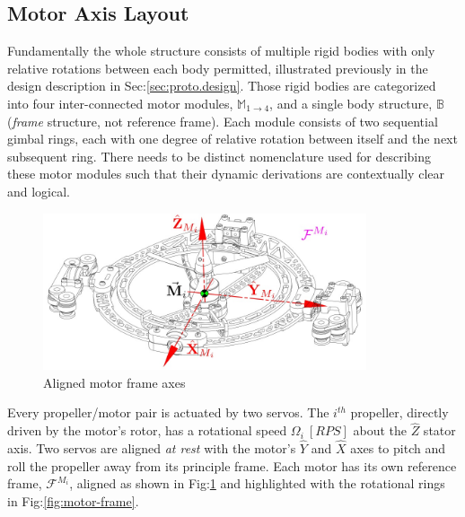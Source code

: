 \subsection{Motor Axis Layout}
\label{subsec:proto.conventions.motoraxis}
Fundamentally the whole structure consists of multiple rigid bodies with only relative rotations between each body permitted, illustrated previously in the design description in Sec:\ref{sec:proto.design}. Those rigid bodies are categorized into four inter-connected motor modules, $\mathbb{M}_{1\rightarrow 4}$, and a single body structure, $\mathbb{B}$ (\emph{frame} structure, not reference frame). Each module consists of two sequential gimbal rings, each with one degree of relative rotation between itself and the next subsequent ring. There needs to be distinct nomenclature used for describing these motor modules such that their dynamic derivations are contextually clear and logical. 
\begin{figure}[htbp]
\centering
\includegraphics[width=0.85\textwidth]{figs/motor-axes}
\caption{Aligned motor frame axes}
\label{fig:motor-axes}
\vspace{-10pt}
\end{figure}
\par
Every propeller/motor pair is actuated by two servos. The $i^{th}$ propeller, directly driven by the motor's rotor, has a rotational speed $\Omega_i~[RPS]$ about the $\hat{Z}$ stator axis. Two servos are aligned \emph{at rest} with the motor's $\hat{Y}$ and $\hat{X}$ axes to pitch and roll the propeller away from its principle frame. Each motor has its own reference frame, $\mathcal{F}^{M_i}$, aligned as shown in Fig:\ref{fig:motor-axes} and highlighted with the rotational rings in Fig:\ref{fig:motor-frame}.
\par
